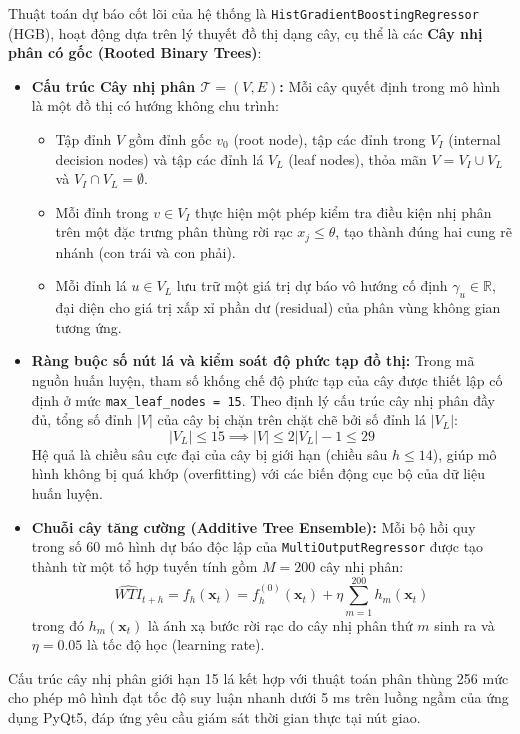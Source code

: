 Thuật toán dự báo cốt lõi của hệ thống là \texttt{HistGradientBoostingRegressor} (HGB), hoạt động dựa trên lý thuyết đồ thị dạng cây, cụ thể là các \textbf{Cây nhị phân có gốc (Rooted Binary Trees)}:

\begin{itemize}
    \item \textbf{Cấu trúc Cây nhị phân $\mathcal{T} = (V, E)$:} 
    Mỗi cây quyết định trong mô hình là một đồ thị có hướng không chu trình:
    \begin{itemize}
        \item Tập đỉnh $V$ gồm đỉnh gốc $v_0$ (root node), tập các đỉnh trong $V_I$ (internal decision nodes) và tập các đỉnh lá $V_L$ (leaf nodes), thỏa mãn $V = V_I \cup V_L$ và $V_I \cap V_L = \emptyset$.
        \item Mỗi đỉnh trong $v \in V_I$ thực hiện một phép kiểm tra điều kiện nhị phân trên một đặc trưng phân thùng rời rạc $x_j \le \theta$, tạo thành đúng hai cung rẽ nhánh (con trái và con phải).
        \item Mỗi đỉnh lá $u \in V_L$ lưu trữ một giá trị dự báo vô hướng cố định $\gamma_u \in \mathbb{R}$, đại diện cho giá trị xấp xỉ phần dư (residual) của phân vùng không gian tương ứng.
    \end{itemize}

    \item \textbf{Ràng buộc số nút lá và kiểm soát độ phức tạp đồ thị:} 
    Trong mã nguồn huấn luyện, tham số khống chế độ phức tạp của cây được thiết lập cố định ở mức \texttt{max\_leaf\_nodes = 15}. Theo định lý cấu trúc cây nhị phân đầy đủ, tổng số đỉnh $|V|$ của cây bị chặn trên chặt chẽ bởi số đỉnh lá $|V_L|$:
    \begin{equation*}
        |V_L| \le 15 \implies |V| \le 2|V_L| - 1 \le 29
    \end{equation*}
    Hệ quả là chiều sâu cực đại của cây bị giới hạn (chiều sâu $h \le 14$), giúp mô hình không bị quá khớp (overfitting) với các biến động cục bộ của dữ liệu huấn luyện.

    \item \textbf{Chuỗi cây tăng cường (Additive Tree Ensemble):} 
    Mỗi bộ hồi quy trong số 60 mô hình dự báo độc lập của \texttt{MultiOutputRegressor} được tạo thành từ một tổ hợp tuyến tính gồm $M = 200$ cây nhị phân:
    \begin{equation*}
        \widehat{WTI}_{t+h} = f_h(\mathbf{x}_t) = f_{h}^{(0)}(\mathbf{x}_t) + \eta \sum_{m=1}^{200} h_m(\mathbf{x}_t)
    \end{equation*}
    trong đó $h_m(\mathbf{x}_t)$ là ánh xạ bước rời rạc do cây nhị phân thứ $m$ sinh ra và $\eta = 0.05$ là tốc độ học (learning rate).
\end{itemize}

Cấu trúc cây nhị phân giới hạn 15 lá kết hợp với thuật toán phân thùng 256 mức cho phép mô hình đạt tốc độ suy luận nhanh dưới 5 ms trên luồng ngầm của ứng dụng PyQt5, đáp ứng yêu cầu giám sát thời gian thực tại nút giao.